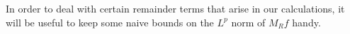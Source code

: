 %
%
%
%

In order to deal with certain remainder terms that arise in our calculations, it will be useful to keep some naive bounds on the $L^p$ norm of $M_R f$ handy.

